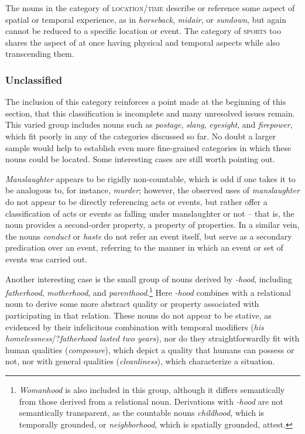 \documentclass[output=paper]{langscibook}
\begin{document}
The nouns in the category of \textsc{location/time} describe or reference some aspect of spatial or temporal experience, as in \textit{horseback},  \textit{midair}, or \textit{sundown}, but again cannot be reduced to a specific location or event.  The category of \textsc{sports} too shares the aspect of at once having physical and temporal aspects while also transcending them.  


\subsubsection{Unclassified}  The inclusion of this category  reinforces a point made at the beginning of this section, that this classification is incomplete and many unresolved issues remain.  This varied group  includes nouns such as \textit{postage}, \textit{slang}, \textit{eyesight}, and \textit{firepower}, which fit poorly in any of the categories discussed so far.  No doubt a larger sample would help to establish even more fine-grained categories in which these nouns could be located.  Some interesting cases are still worth pointing out.  

\begin{sloppypar}
\textit{Manslaughter} appears to be rigidly non-countable, which is odd if one takes it to be analogous to, for instance, \textit{murder}; however, the observed uses of \textit{manslaughter} do not appear to be directly referencing acts or events, but rather offer a classification of acts or events as falling under manslaughter or not -- that is, the noun provides a second-order property, a property of properties. In a similar vein, the nouns \textit{conduct} or \textit{haste} do not refer an event itself, but serve as a secondary predication over an event, referring to the manner in which an event or set of events was carried out.
\end{sloppypar}


Another interesting case is the small group of nouns derived by \textit{-hood}, including \textit{fatherhood}, \textit{motherhood}, and \textit{parenthood}.\footnote{\textit{Womanhood} is also included in this group, although it differs semantically from those derived from a relational noun.  Derivations with \textit{-hood} are not semantically transparent, as the countable nouns \textit{childhood}, which is temporally grounded, or \textit{neighborhood}, which is spatially grounded, attest.}  Here \textit{-hood} combines with a relational noun to derive some more abstract quality or property associated with participating in that relation.  These nouns do not appear to be stative, as evidenced by their infelicitous combination with temporal modifiers (\textit{his homelessness}/?\textit{fatherhood lasted two years}), nor do they straightforwardly fit with human qualities (\textit{composure}), which depict a quality that humans can possess or not, nor with general qualities (\textit{cleanliness}), which characterize a situation. %
\end{document}

